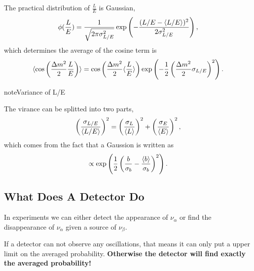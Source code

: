 \documentclass[letterpaper,12pt,english]{sphinxmanual}
\begin{document}
The practical distribution of \(\frac{L}{E}\) is Gaussian, \footnotemark[1]
\begin{gather}
\begin{split}\phi(\frac{L}{E}) = \frac{1}{\sqrt{2\pi \sigma_{L/E}^2}} \exp\left( -\frac{(L/E - \langle L/E\rangle)^2}{2\sigma_{L/E}^2} \right),\end{split}\notag
\end{gather}
which determines the average of the cosine term is \footnotemark[1]
\begin{gather}
\begin{split}\langle \cos \left(\frac{\Delta m^2}{2} \frac{L}{E} \right)\rangle = \cos\left( \frac{\Delta m^2}{2} \langle \frac{L}{E} \rangle \right)\exp\left( -\frac{1}{2}\left( \frac{\Delta m^2}{2} \sigma_{L/E} \right)^2 \right).\end{split}\notag
\end{gather}
\begin{notice}{note}{Variance of L/E}

The virance can be splitted into two parts,
\begin{gather}
\begin{split}\left( \frac{\sigma_{L/E}}{\langle L/E\rangle} \right)^2 = \left( \frac{\sigma_L}{\langle L\rangle} \right)^2 + \left( \frac{\sigma_E}{\langle E\rangle} \right)^2,\end{split}\notag
\end{gather}
which comes from the fact that a Gaussion is written as
\begin{gather}
\begin{split}\propto \exp\left( \frac{1}{2} \left( \frac{b}{\sigma_b} - \frac{\langle b\rangle}{\sigma_b} \right)^2 \right).\end{split}\notag
\end{gather}\end{notice}


\subsection{What Does A Detector Do}
\label{experiments:what-does-a-detector-do}
In experiments we can either detect the appearance of \(\nu_\alpha\) or find the disappearance of \(\nu_\alpha\) given a source of \(\nu_\beta\).

If a detector can not observe any oscillations, that means it can only put a upper limit on the averaged probability. \textbf{Otherwise the detector will find exactly the averaged probability!}
\end{document}
